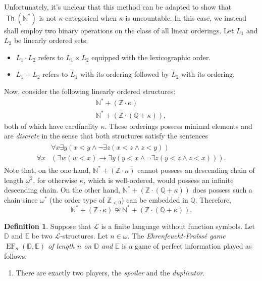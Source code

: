 \documentclass[10pt,letterpaper,cm]{nupset}
\theoremstyle{definition}
\newtheorem{definition}{Definition}
\theoremstyle{theorem}
\theoremstyle{remark}
\newcommand{\D}{\mathbb D}
\newcommand{\E}{\mathbb E}
\renewcommand{\L}{\mathcal L}
\newcommand{\N}{\mathbb N}
\newcommand{\Q}{\mathbb Q}
\newcommand{\Z}{\mathbb Z}
\newcommand{\1}{\mathbb{1}}
\renewcommand{\i}{\vec i}
\newcommand{\0}{\vec 0}
\DeclareMathOperator{\ef}{EF}
\DeclareMathOperator{\thh}{\mathsf{Th}}
\begin{document}
\begin{solution}
Unfortunately, it's unclear that this method can be adapted to show that $\thh(\N^{\ast})$ is not $\kappa$-categorical when $\kappa$ is uncountable. In this case, we instead shall employ two binary  operations on the class of all linear orderings.
Let $L_1$ and $L_2$ be linearly ordered sets.
\begin{itemize}
\item $L_1 \cdot L_2$ refers to $L_1 \times L_2$ equipped with the lexicographic order.
\item ${L_1 + L_2}$ refers to $L_1$ with its ordering followed by $L_2$ with its ordering.
\end{itemize}
Now, consider the following linearly ordered structures:
\begin{gather*}
 {\N^{\ast} + \left(\Z \cdot \kappa\right)}
\\ {\N^{\ast} +  \left(\Z \cdot \left(\Q +\kappa\right)\right)},
\end{gather*} both of which have cardinality $\kappa$.
These orderings possess minimal elements and are \textit{discrete} in the sense that both structures satisfy the sentences
\begin{align}
\begin{split}
& \forall{x}\exists{y}\left(x<y \land \neg{\exists{z}\left(x<z \land z<y\right)}\right) \\
 \forall{x}&\left(\exists{w}\left(w < x\right)\rightarrow \exists{y}\left(y<x \land \neg{\exists{z}\left(y<z \land z<x\right)}\right)\right).
\end{split} \label{eqn:disc}
\end{align}
Note that, on the one hand, $ {\N^{\ast} + \left(\Z \cdot \kappa\right)}$ cannot possess an descending chain of length $\omega^2$, for otherwise $\kappa$, which is well-ordered, would possess an infinite descending chain. On the other hand, ${\N^{\ast} +  \left(\Z \cdot \left(\Q +\kappa\right)\right)}$ does possess such a chain since $\omega^{\ast}$ (the order type of $\Z_{<0}$) can be embedded in $\Q$. Therefore, \[
{\N^{\ast} + \left(\Z \cdot \kappa\right)} \not\cong {\N^{\ast} +  \left(\Z \cdot \left(\Q +\kappa\right)\right)}.
\]
\begin{definition}
Suppose that $\L$ is a finite language without function symbols. Let $\D$ and $\E$ be two $\L$-structures. Let $n\in \omega$. The \textit{Ehrenfeucht-Fra\"{\i}ss\'e  game $\ef_n(\D, \E)$ of length $n$ on $\D$ and $\E$} is a game of perfect information played as follows.
\begin{enumerate}[label=(\alph*)]
\item There are exactly two players, the \textit{spoiler} and the \textit{duplicator}.

\end{enumerate}
\end{definition}
\end{solution}
\end{document}
